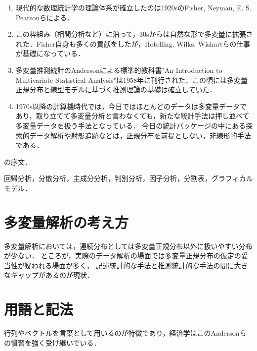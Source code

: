 \documentclass[uplatex,dvipdfmx]{jsreport}
\begin{document}
\begin{enumerate}
    \item 現代的な数理統計学の理論体系が確立したのは1920sのFisher, Neyman, E. S. Pearsonらによる．
    \item この枠組み（相関分析など）に沿って，30sからは自然な形で多変量に拡張された．Fisher自身も多くの貢献をしたが，Hotelling, Wilks, Wishartらの仕事が基礎になっている．
    \item 多変量推測統計のAndersonによる標準的教科書"An Introduction to Multivariate Statistical Analysis"は1958年に刊行された．この頃には多変量正規分布と線型モデルに基づく推測理論の基礎は確立していた．
    \item 1970s以降の計算機時代では，今日ではほとんどのデータは多変量データであり，取り立てて多変量分析と言わなくても，新たな統計手法は押し並べて多変量データを扱う手法となっている．
    今日の統計パッケージの中にある探索的データ解析や射影追跡などは，正規分布を前提としない，非線形的手法である．
\end{enumerate}
\cite{フロンティア１}の序文．

\begin{example}
    回帰分析，分散分析，主成分分析，判別分析，因子分析，分割表，グラフィカルモデル．
\end{example}

\section{多変量解析の考え方}

多変量解析においては，連続分布としては多変量正規分布以外に扱いやすい分布が少ない．
ところが，実際のデータ解析の場面では多変量正規分布の仮定の妥当性が疑われる場面が多く，
記述統計的な手法と推測統計的な手法の間に大きなギャップがあるのが現状．\cite{フロンティア１}

\section{用語と記法}

\begin{tcolorbox}[colframe=ForestGreen, colback=ForestGreen!10!white,breakable,colbacktitle=ForestGreen!40!white,coltitle=black,fonttitle=\bfseries\sffamily,
title=]
    行列やベクトルを言葉として用いるのが特徴であり，経済学はこのAndersonらの慣習を強く受け継いでいる．
\end{tcolorbox}
\end{document}
